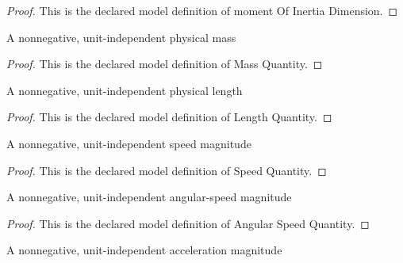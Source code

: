 \begin{proof}
  This is the declared model definition of moment Of Inertia Dimension.
\end{proof}
\begin{definition}
  \label{def:physics:phyx-mini-0786:phyxminiproblems-problemphyxmini0786-massquantity}
  A nonnegative, unit-independent physical mass
\end{definition}
\begin{proof}
  This is the declared model definition of Mass Quantity.
\end{proof}
\begin{definition}
  \label{def:physics:phyx-mini-0786:phyxminiproblems-problemphyxmini0786-lengthquantity}
  A nonnegative, unit-independent physical length
\end{definition}
\begin{proof}
  This is the declared model definition of Length Quantity.
\end{proof}
\begin{definition}
  \label{def:physics:phyx-mini-0786:phyxminiproblems-problemphyxmini0786-speedquantity}
  A nonnegative, unit-independent speed magnitude
\end{definition}
\begin{proof}
  This is the declared model definition of Speed Quantity.
\end{proof}
\begin{definition}
  \label{def:physics:phyx-mini-0786:phyxminiproblems-problemphyxmini0786-angularspeedquantity}
  A nonnegative, unit-independent angular-speed magnitude
\end{definition}
\begin{proof}
  This is the declared model definition of Angular Speed Quantity.
\end{proof}
\begin{definition}
  \label{def:physics:phyx-mini-0786:phyxminiproblems-problemphyxmini0786-accelerationquantity}
  A nonnegative, unit-independent acceleration magnitude
\end{definition}
